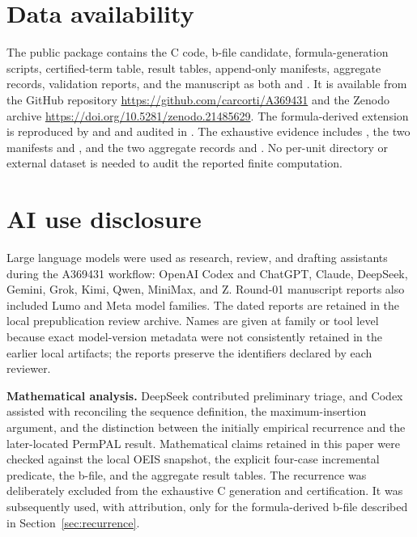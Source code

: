 \documentclass[11pt]{article}
\theoremstyle{definition}
\theoremstyle{remark}
\begin{document}
\section*{Data availability}
\begin{sloppypar}

The public package contains the C code, b-file candidate,
formula-generation scripts, certified-term table, result tables, append-only
manifests, aggregate records, validation reports, and the manuscript as both
 and .  It is available from
the GitHub repository \url{https://github.com/carcorti/A369431} and the Zenodo
archive \url{https://doi.org/10.5281/zenodo.21485629}.  The formula-derived
extension is reproduced by
 and  and
audited in
.  The exhaustive
evidence includes , the two manifests
 and
, and the two aggregate records
 and
.  No per-unit directory or external
dataset is needed to audit the reported finite computation.
\end{sloppypar}

\section*{AI use disclosure}

Large language models were used as research, review, and drafting assistants
during the A369431 workflow: OpenAI Codex and ChatGPT, Claude, DeepSeek,
Gemini, Grok, Kimi, Qwen, MiniMax, and Z.  Round-01 manuscript reports also
included Lumo and Meta model families.  The dated reports are retained in the
local prepublication review archive.  Names are given at family or tool level
because exact model-version metadata were not consistently retained in the
earlier local artifacts; the reports preserve the identifiers declared by
each reviewer.

\noindent\textbf{Mathematical analysis.}
DeepSeek contributed preliminary triage, and Codex assisted with reconciling
the sequence definition, the maximum-insertion argument, and the distinction
between the initially empirical recurrence and the later-located PermPAL
result.  Mathematical
claims retained in this paper were checked against the local OEIS snapshot,
the explicit four-case incremental predicate, the b-file, and the aggregate
result tables.  The recurrence was deliberately excluded from the exhaustive
C generation and certification.  It was subsequently used, with attribution,
only for the formula-derived b-file described in
Section~\ref{sec:recurrence}.
\end{document}
